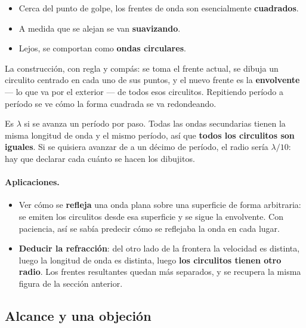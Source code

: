 \documentclass[12pt,a4paper]{article}
\begin{document}
\begin{itemize}
  \item Cerca del punto de golpe, los frentes de onda son esencialmente
        \textbf{cuadrados}.
  \item A medida que se alejan se van \textbf{suavizando}.
  \item Lejos, se comportan como \textbf{ondas circulares}.
\end{itemize}

La construcción, con regla y compás: se toma el frente actual, se dibuja un
circulito centrado en cada uno de sus puntos, y el nuevo frente es la
\textbf{envolvente} --- lo que va por el exterior --- de todos esos circulitos.
Repitiendo período a período se ve cómo la forma cuadrada se va redondeando.

\begin{notebox}
Es $\lambda$ si se avanza un período por paso. Todas las ondas secundarias tienen
la misma longitud de onda y el mismo período, así que \textbf{todos los
circulitos son iguales}. Si se quisiera avanzar de a un décimo de período, el
radio sería $\lambda/10$: hay que declarar cada cuánto se hacen los dibujitos.
\end{notebox}



\paragraph{Aplicaciones.}
\begin{itemize}
  \item Ver cómo se \textbf{refleja} una onda plana sobre una superficie de forma
        arbitraria: se emiten los circulitos desde esa superficie y se sigue la
        envolvente. Con paciencia, así se sabía predecir cómo se reflejaba la
        onda en cada lugar.
  \item \textbf{Deducir la refracción}: del otro lado de la frontera la velocidad
        es distinta, luego la longitud de onda es distinta, luego \textbf{los
        circulitos tienen otro radio}. Los frentes resultantes quedan más
        separados, y se recupera la misma figura de la sección anterior.
\end{itemize}

\subsection{Alcance y una objeción}
\end{document}
